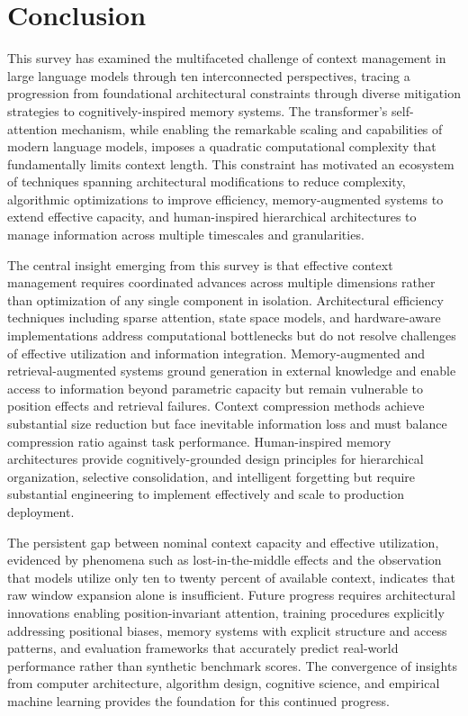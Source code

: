 \documentclass[11pt,letterpaper]{article}
\begin{document}
\section{Conclusion}
\label{sec:conclusion}

This survey has examined the multifaceted challenge of context management in large language models through ten interconnected perspectives, tracing a progression from foundational architectural constraints through diverse mitigation strategies to cognitively-inspired memory systems. The transformer's self-attention mechanism, while enabling the remarkable scaling and capabilities of modern language models, imposes a quadratic computational complexity that fundamentally limits context length. This constraint has motivated an ecosystem of techniques spanning architectural modifications to reduce complexity, algorithmic optimizations to improve efficiency, memory-augmented systems to extend effective capacity, and human-inspired hierarchical architectures to manage information across multiple timescales and granularities.

The central insight emerging from this survey is that effective context management requires coordinated advances across multiple dimensions rather than optimization of any single component in isolation. Architectural efficiency techniques including sparse attention, state space models, and hardware-aware implementations address computational bottlenecks but do not resolve challenges of effective utilization and information integration. Memory-augmented and retrieval-augmented systems ground generation in external knowledge and enable access to information beyond parametric capacity but remain vulnerable to position effects and retrieval failures. Context compression methods achieve substantial size reduction but face inevitable information loss and must balance compression ratio against task performance. Human-inspired memory architectures provide cognitively-grounded design principles for hierarchical organization, selective consolidation, and intelligent forgetting but require substantial engineering to implement effectively and scale to production deployment.

The persistent gap between nominal context capacity and effective utilization, evidenced by phenomena such as lost-in-the-middle effects and the observation that models utilize only ten to twenty percent of available context, indicates that raw window expansion alone is insufficient. Future progress requires architectural innovations enabling position-invariant attention, training procedures explicitly addressing positional biases, memory systems with explicit structure and access patterns, and evaluation frameworks that accurately predict real-world performance rather than synthetic benchmark scores. The convergence of insights from computer architecture, algorithm design, cognitive science, and empirical machine learning provides the foundation for this continued progress.
\end{document}
